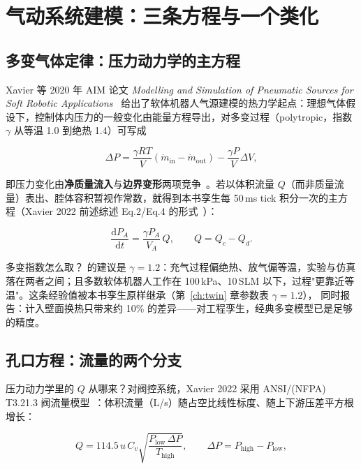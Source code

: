 \section{气动系统建模：三条方程与一个类化}
\label{sec:pneu-modeling}

\subsection{多变气体定律：压力动力学的主方程}

Xavier 等 2020 年 AIM 论文 \emph{Modelling and Simulation of Pneumatic Sources for Soft Robotic Applications}~\cite{Xavier2020AIM} 给出了软体机器人气源建模的热力学起点：理想气体假设下，控制体内压力的一般变化由能量方程导出，对多变过程（polytropic，指数 $\gamma$ 从等温 1.0 到绝热 1.4）可写成

\begin{equation}
\Delta P = \frac{\gamma R T}{V}\left(\dot m_{\mathrm{in}} - \dot m_{\mathrm{out}}\right) - \frac{\gamma P}{V}\Delta V,
\label{eq:pneu-energy}
\end{equation}

即压力变化由\textbf{净质量流入}与\textbf{边界变形}两项竞争~\cite{Xavier2020AIM}。若以体积流量 $Q$（而非质量流量）表出、腔体容积暂视作常数，就得到本书孪生每 50\,ms tick 积分一次的主方程（Xavier 2022 前述综述 Eq.2/Eq.4 的形式~\cite{Xavier2022Frontiers}）：

\begin{equation}
\frac{\mathrm{d}P_A}{\mathrm{d}t} = \frac{\gamma P_A}{V_A}\, Q,
\qquad Q = Q_c - Q_d .
\label{eq:pneu-dpdt}
\end{equation}

多变指数怎么取？\cite{Xavier2020AIM} 的建议是 $\gamma=1.2$：充气过程偏绝热、放气偏等温，实验与仿真落在两者之间；且多数软体机器人工作在 100\,kPa、10\,SLM 以下，过程"更靠近等温"。这条经验值被本书孪生原样继承（第~\ref{ch:twin} 章参数表 $\gamma{=}1.2$），\cite{Xavier2020AIM} 同时报告：计入壁面换热只带来约 10\% 的差异——对工程孪生，经典多变模型已是足够的精度。

\subsection{孔口方程：流量的两个分支}

压力动力学里的 $Q$ 从哪来？对阀控系统，Xavier 2022 采用 ANSI/(NFPA) T3.21.3 阀流量模型~\cite{Xavier2022Frontiers}：体积流量（L/s）随占空比线性标度、随上下游压差平方根增长：

\begin{equation}
Q = 114.5\, u\, C_v \sqrt{\frac{P_{\mathrm{low}}\,\Delta P}{T_{\mathrm{high}}}},
\qquad \Delta P = P_{\mathrm{high}} - P_{\mathrm{low}},
\label{eq:pneu-ansi}
\end{equation}

